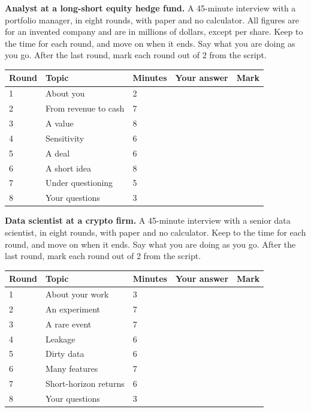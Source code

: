 \vfill\clearpage
\begin{question}\label{iq:iv2:mock-interviews:4}
\textbf{Analyst at a long-short equity hedge fund.} A 45-minute interview with a portfolio manager, in eight rounds, with paper and no calculator. All figures are for an invented company and are in millions of dollars, except per share. Keep to the time for each round, and move on when it ends. Say what you are doing as you go. After the last round, mark each round out of 2 from the script.

\medskip
\begin{tabular}{@{}l|l|l|l|l@{}}
Round & Topic & Minutes & Your answer & Mark \\ \hline
1 & About you & 2 & & \\[6pt]\hline
2 & From revenue to cash & 7 & & \\[6pt]\hline
3 & A value & 8 & & \\[6pt]\hline
4 & Sensitivity & 6 & & \\[6pt]\hline
5 & A deal & 6 & & \\[6pt]\hline
6 & A short idea & 8 & & \\[6pt]\hline
7 & Under questioning & 5 & & \\[6pt]\hline
8 & Your questions & 3 & & \\[6pt]\hline
\end{tabular}
\end{question}

\vfill\clearpage
\begin{question}\label{iq:iv2:mock-interviews:5}
\textbf{Data scientist at a crypto firm.} A 45-minute interview with a senior data scientist, in eight rounds, with paper and no calculator. Keep to the time for each round, and move on when it ends. Say what you are doing as you go. After the last round, mark each round out of 2 from the script.

\medskip
\begin{tabular}{@{}l|l|l|l|l@{}}
Round & Topic & Minutes & Your answer & Mark \\ \hline
1 & About your work & 3 & & \\[6pt]\hline
2 & An experiment & 7 & & \\[6pt]\hline
3 & A rare event & 7 & & \\[6pt]\hline
4 & Leakage & 6 & & \\[6pt]\hline
5 & Dirty data & 6 & & \\[6pt]\hline
6 & Many features & 7 & & \\[6pt]\hline
7 & Short-horizon returns & 6 & & \\[6pt]\hline
8 & Your questions & 3 & & \\[6pt]\hline
\end{tabular}
\end{question}

